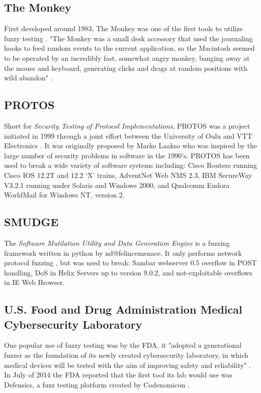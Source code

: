 \documentclass[10pt, final, journal, letterpaper, twoside, twocolumn]{IEEEtran}
\begin{document}
	\subsection{The Monkey}
		First developed around 1983, The Monkey was one of the first tools to utilize fuzzy testing \cite{textbook}. "The Monkey was a small desk accessory that used the journaling hooks to feed random events to the current application, so the Macintosh seemed to be operated by an incredibly fast, somewhat angry monkey, banging away at the mouse and keyboard, generating clicks and drags at random positions with wild abandon" \cite{monkey}.
		
	\subsection{PROTOS}
		Short for \textit{Security Testing of Protocol Implementations}, PROTOS was a project initiated in 1999 through a joint effort between the University of Oulu and VTT Electronics \cite{protos}. It was originally proposed by Marko Laakso who was inspired by the large number of security problems in software in the 1990's. PROTOS has been used to break a wide variety of software systems including: Cisco Routers running Cisco IOS 12.2T and 12.2 `X' trains, AdventNet Web NMS 2.3, IBM SecureWay V3.2.1 running under Solaris and Windows 2000, and Qualcomm Eudora WorldMail for Windows NT, version 2.
		
	\subsection{SMUDGE}
		The \textit{Software Mutilation Utility and Data Generation Engine} is a fuzzing framework written in python by nd@felincemenace. It only performs network protocol fuzzing \cite{fuzzing}, but was used to break: Sambar webserver 0.5 overflow in POST handling, DoS in Helix Servers up to version 9.0.2, and not-exploitable overflows in IE Web Browser.
	
	\subsection{U.S. Food and Drug Administration Medical Cybersecurity Laboratory}
		One popular use of fuzzy testing was by the FDA, it "adopted a generational fuzzer as the foundation of its newly created cybersecurity laboratory, in which medical devices will be tested with the aim of improving safety and reliability" \cite{fda}. In July of 2014 the FDA reported that the first tool its lab would use was Defensics, a fuzz testing platform created by Codenomicon \cite{codenomicon}.
		
\end{document}
